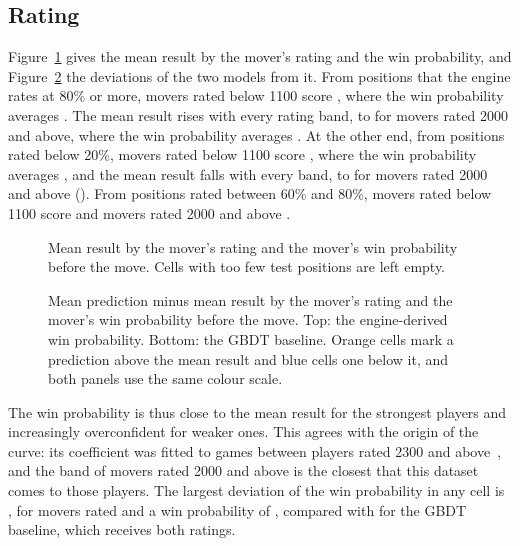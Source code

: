 \documentclass[11pt]{article}
\begin{document}
\subsection{Rating}

Figure~\ref{fig:grid-rating} gives the mean result by the mover's rating and
the win probability, and Figure~\ref{fig:grid-rating-off} the deviations of
the two models from it. From positions that the engine rates at 80\% or more,
movers rated below 1100 score , where
the win probability averages
. The mean result rises with
every rating band, to  for movers rated
2000 and above, where the win probability averages
. At the other end, from
positions rated below 20\%, movers rated below 1100 score
, where the win probability averages
, and the mean result falls
with every band, to  for movers rated
2000 and above (). From
positions rated between 60\% and 80\%, movers rated below 1100 score
 and movers rated 2000 and above
.

\begin{figure}[htbp]\centering
{}
\caption{Mean result by the mover's rating and the mover's win probability
before the move. Cells with too few test positions are left empty.}
\label{fig:grid-rating}
\end{figure}

\begin{figure}[htbp]\centering
{}
\caption{Mean prediction minus mean result by the mover's rating and the
mover's win probability before the move. Top: the engine-derived win
probability. Bottom: the GBDT baseline. Orange cells mark a prediction above
the mean result and blue cells one below it, and both panels use the same
colour scale.}
\label{fig:grid-rating-off}
\end{figure}

The win probability is thus close to the mean result for the strongest
players and increasingly overconfident for weaker ones. This agrees with the
origin of the curve: its coefficient was fitted to games between players
rated 2300 and above~\cite{lilawinchances}, and the band of movers rated 2000
and above is the closest that this dataset comes to those players. The
largest deviation of the win probability in any cell is
, for movers rated
 and a win probability of
, compared with
 for the GBDT baseline, which receives
both ratings.
\end{document}
